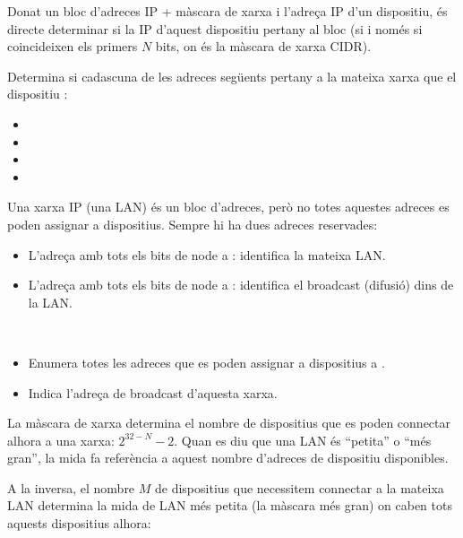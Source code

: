 Donat un bloc d'adreces IP + màscara de xarxa i l'adreça IP d'un dispositiu, és directe determinar 
si la IP d'aquest dispositiu pertany al bloc (si i només si coincideixen els primers $N$ bits,
on  és la màscara de xarxa CIDR).

\begin{exercise}
Determina si cadascuna de les adreces següents pertany a la mateixa xarxa que
el dispositiu :
\begin{itemize}
\item {}
\item {}
\item {}
\item {}
\end{itemize}
\end{exercise}

Una xarxa IP (una LAN) és un bloc d'adreces, però no totes aquestes adreces 
es poden assignar a dispositius. Sempre hi ha dues adreces reservades:
\begin{itemize}
\item L'adreça amb tots els bits de node a : identifica la mateixa LAN.
\item L'adreça amb tots els bits de node a : identifica el broadcast (difusió) dins de la LAN.
\end{itemize}

\begin{exercise}\ \\[-0.5cm]
\begin{itemize}
\item Enumera totes les adreces que es poden assignar a dispositius a .
\item Indica l'adreça de broadcast d'aquesta xarxa.
\end{itemize}
\end{exercise}

La màscara de xarxa  determina el nombre de dispositius que es poden connectar alhora
a una xarxa: $2^{32-N} - 2$. Quan es diu que una LAN és ``petita'' o ``més gran'', la mida fa referència a aquest 
nombre d'adreces de dispositiu disponibles. 

A la inversa, el nombre $M$ de dispositius que necessitem connectar a la mateixa LAN determina la 
mida de LAN més petita (la màscara  més gran) on caben tots aquests dispositius alhora:

